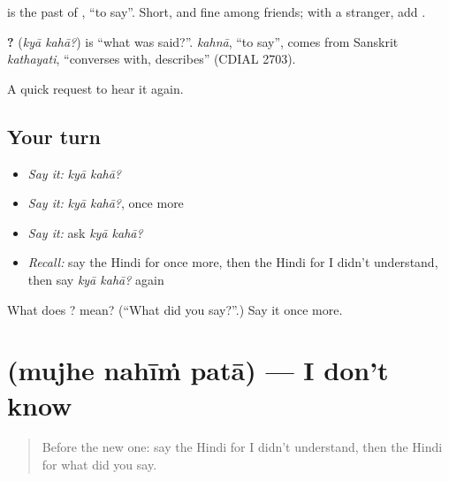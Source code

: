 \textbf{} is the past of \textbf{}, \textquotedblleft{}to say\textquotedblright{}. Short, and fine among friends; with a stranger, add \textbf{}.

\begin{cousinweb}
\textbf{ ?} (\emph{kyā kahā?}) is \textquotedblleft{}what was said?\textquotedblright{}. \emph{kahnā}, \textquotedblleft{}to say\textquotedblright{}, comes from Sanskrit \emph{kathayati}, \textquotedblleft{}converses with, describes\textquotedblright{} (CDIAL 2703).
\end{cousinweb}

\begin{grammarlens}[title={What you've built}]
A quick request to hear it again.
\end{grammarlens}

\subsection*{Your turn}
\begin{itemize}
\raggedright
  \item \emph{Say it:} \emph{kyā kahā?}
  \item \emph{Say it:} \emph{kyā kahā?}, once more
  \item \emph{Say it:} ask \emph{kyā kahā?}
  \item \emph{Recall:} say the Hindi for once more, then the Hindi for I didn't understand, then say \emph{kyā kahā?} again
\end{itemize}

\begin{tcolorbox}[breakable,colback=teal!4,colframe=teal!35!black,title={Before you move on}]
What does  ? mean? (\textquotedblleft{}What did you say?\textquotedblright{}.) Say it once more.
\end{tcolorbox}
\section[\texorpdfstring{\hi{मुझे} \hi{नहीं} \hi{पता} (mujhe nahīṁ patā)}{मुझे नहीं पता (mujhe nahīṁ patā)}]{   (mujhe nahīṁ patā) — I don't know}

\label{lesson:HI-C126-nahinpata}



\begin{quote}
Before the new one: say the Hindi for I didn't understand, then the Hindi for what did you say.
\end{quote}

